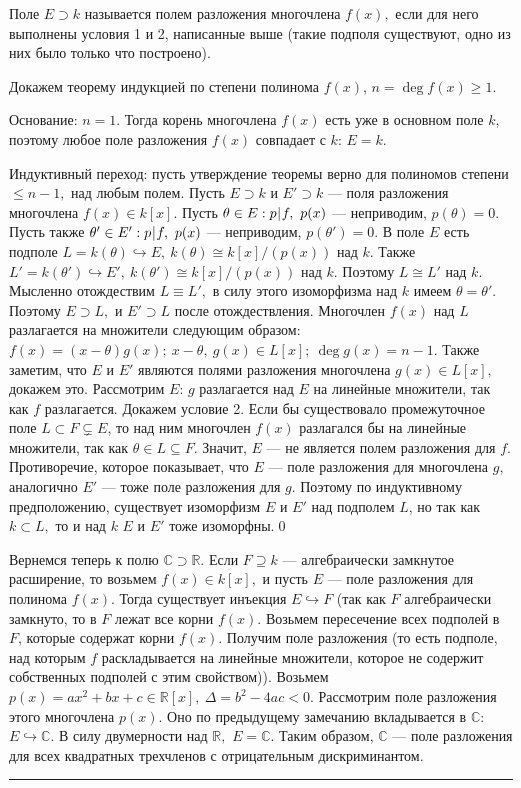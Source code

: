 \de Поле $E\supset k$ называется полем разложения многочлена $f(x),$ если для него выполнены условия 1 и 2, написанные выше
(такие подполя существуют, одно из них было только что построено).


\dok Докажем теорему индукцией по степени полинома $f(x)$, $n=\deg f(x)\ge 1$.

Основание: $n=1.$ Тогда корень многочлена $f(x)$ есть уже в основном поле $k$, поэтому любое поле разложения $f(x)$ совпадает с $k$: $E=k$.

Индуктивный переход: пусть утверждение теоремы верно для полиномов степени $\le n-1,$ над любым полем. Пусть $E\supset k$ и $E'\supset k$ --- поля
разложения многочлена $f(x)\in k[x].$ Пусть $\theta\in E : p\,\vrule\,f,\ p(x)$ --- неприводим, $p(\theta)=0.$ Пусть также $\theta'\in E' : p\,\vrule\,f,\ p(x)$ --- неприводим, $p(\theta')=0.$
В поле $E$ есть подполе $L=k(\theta)\hookrightarrow E,\ k(\theta)\cong k[x]/(p(x))$ над $k$. Также $L'=k(\theta')\hookrightarrow E',\ k(\theta')\cong k[x]/(p(x))$ над $k$.
Поэтому $L\cong L'$ над $k$. Мысленно отождествим $L\equiv L',$ в силу этого изоморфизма над $k$ имеем $\theta=\theta'.$ Поэтому $E\supset L,\mbox{ и }E'\supset L$ после отождествления.
Многочлен $f(x)$ над $L$ разлагается на множители следующим образом: $f(x)=(x-\theta)g(x);\ x-\theta,\ g(x)\in L[x];\ \deg g(x)=n-1.$
Также заметим, что $E$ и $E'$ являются полями разложения многочлена $g(x)\in L[x],$ докажем это.
Рассмотрим $E$: $g$ разлагается над $E$ на линейные множители, так как $f$ разлагается. Докажем условие 2. Если бы существовало промежуточное поле $L\subset F\subsetneq E$, то
над ним многочлен $f(x)$ разлагался бы на линейные множители, так как $\theta\in L\subseteq F.$ Значит, $E$ --- не является полем разложения для $f$. Противоречие, которое показывает, что
$E$ --- поле разложения для многочлена $g$, аналогично $E'$ --- тоже поле разложения для $g$. Поэтому по индуктивному предположению, существует изоморфизм $E$ и $E'$ над
подполем $L$, но так как $k\subset L,$ то и над $k$ $E$ и $E'$ тоже изоморфны.\quad\qed

Вернемся теперь к полю $\mathbb C\supset \mathbb R.$ Если
$F\supseteq k$ --- алгебраически замкнутое расширение, то возьмем
$f(x)\in k[x],$ и пусть $E$ --- поле разложения для полинома
$f(x).$ Тогда существует инъекция $E\hookrightarrow F$ (так как
$F$ алгебраически замкнуто, то в $F$ лежат все корни $f(x)$.
Возьмем пересечение всех подполей в $F$, которые содержат корни
$f(x)$. Получим поле разложения (то есть подполе, над которым $f$
раскладывается на линейные множители, которое не содержит
собственных подполей с этим свойством)). Возьмем
$p(x)=ax^2+bx+c\in\mathbb R[x],\ \Delta=b^2-4ac<0.$ Рассмотрим
поле разложения этого многочлена $p(x)$. Оно по предыдущему
замечанию вкладывается в $\mathbb C:$ $E\hookrightarrow\mathbb C.$
В силу двумерности над $\mathbb R,$ $E=\mathbb C.$ Таким образом,
$\mathbb C$ --- поле разложения для всех квадратных трехчленов с
отрицательным дискриминантом.
\smallskip
\hrule
\rule{0pt}{10pt}

